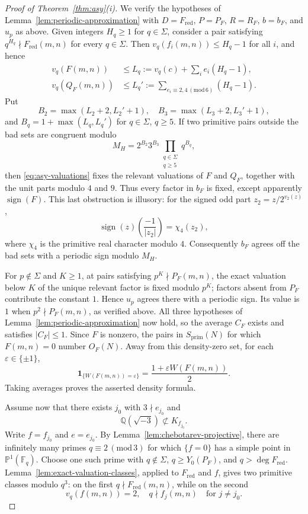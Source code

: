 \documentclass[12pt,reqno]{amsart}
\numberwithin{equation}{section}
\theoremstyle{definition}
\renewcommand{\le}{\leqslant}
\renewcommand{\ge}{\geqslant}
\newcommand{\PP}{\mathbb{P}}
\newcommand{\FF}{\mathbb{F}}
\newcommand{\QQ}{\mathbb{Q}}
\DeclareMathOperator{\sign}{sign}
\newcommand{\rw}{W}
\renewcommand{\pmod}[1]{\,(\mathrm{mod}\,#1)}
\begin{document}
\begin{proof}[Proof of Theorem~\ref{thm:asy}(i)]
We verify the hypotheses of Lemma~\ref{lem:periodic-approximation} with $D=F_{\mathrm{red}}$, $P=P_F$, $R=R_F$, $b=b_F$, and $u_p$ as above.
Given integers $H_q\ge1$ for $q\in\Sigma$, consider a pair satisfying $q^{H_q}\nmid F_{\mathrm{red}}(m,n)$ for every $q\in\Sigma$.
Then $v_q(f_i(m,n))\le H_q-1$ for all $i$, and hence
\[
\begin{aligned}
v_q(F(m,n))&\le L_q:=v_q(c)+\sum_i e_i(H_q-1),\\
v_q(Q_F(m,n))&\le L_q':=
\sum_{e_i\equiv2,4\pmod6}(H_q-1).
\end{aligned}
\]
Put
\[
B_2=\max(L_2+2,L_2'+1),\quad
B_3=\max(L_3+2,L_3'+1),
\]
and $B_q=1+\max(L_q,L_q')$ for $q\in\Sigma$, $q\ge5$.
If two primitive pairs outside the bad sets are congruent modulo
\[
M_H
=2^{B_2}3^{B_3}\prod_{\substack{q\in\Sigma\\q\ge5}}q^{B_q},
\]
then \eqref{eq:asy-valuations} fixes the relevant valuations of $F$ and $Q_F$, together with the unit parts modulo $4$ and $9$.
Thus every factor in $b_F$ is fixed, except apparently $\sign(F)$.
This last obstruction is illusory: for the signed odd part $z_2=z/2^{v_2(z)}$,
\[
\sign(z)\left(\frac{-1}{|z_2|}\right)=\chi_4(z_2),
\]
where $\chi_4$ is the primitive real character modulo $4$.
Consequently $b_F$ agrees off the bad sets with a periodic sign modulo $M_H$.

For $p\notin\Sigma$ and $K\ge1$, at pairs satisfying $p^K\nmid P_F(m,n)$, the exact valuation below $K$ of the unique relevant factor is fixed modulo $p^K$; factors absent from $P_F$ contribute the constant $1$.
Hence $u_p$ agrees there with a periodic sign.
Its value is $1$ when $p^2\nmid P_F(m,n)$, as verified above.
All three hypotheses of Lemma~\ref{lem:periodic-approximation} now hold, so the average $C_F$ exists and satisfies $|C_F|\le1$.
Since $F$ is nonzero, the pairs in $S_{\mathrm{prim}}(N)$ for which $F(m,n)=0$ number $O_F(N)$.
Away from this density-zero set, for each $\varepsilon\in\{\pm1\}$,
\[
\mathbf 1_{\{\rw(F(m,n))=\varepsilon\}}
=\frac{1+\varepsilon\rw(F(m,n))}{2}.
\]
Taking averages proves the asserted density formula.

Assume now that there exists $j_0$ with $3\nmid e_{j_0}$ and
\[
\QQ(\sqrt{-3})\not\subset K_{f_{j_0}}.
\]
Write $f=f_{j_0}$ and $e=e_{j_0}$.
By Lemma~\ref{lem:chebotarev-projective}, there are infinitely many primes $q\equiv 2\pmod 3$ for which $\{f=0\}$ has a simple point in $\PP^1(\FF_q)$.
Choose one such prime with $q\notin\Sigma$, $q\ge Y_0(P_F)$, and $q>\deg F_{\mathrm{red}}$.
Lemma~\ref{lem:exact-valuation-classes}, applied to $F_{\mathrm{red}}$ and $f$, gives two primitive classes modulo $q^3$: on the first $q\nmid F_{\mathrm{red}}(m,n)$, while on the second
\[
v_q(f(m,n))=2,\quad q\nmid f_j(m,n)\quad\text{for }j\ne j_0.
\]


\end{proof}
\end{document}
